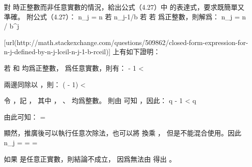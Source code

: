 \startsection[
  title={Proof of the master theorem},
]

\startEXERCISE \DIFFICULT
對  時正整數而非任意實數的情況，給出公式（4.27）中  的表達式，要求既簡單又準確。
附公式（4.27）：
\startformula
 n_j = \startmathcases
   \NC n \NC 若  \NR
   \NC \left\lceil n_{j-1}/b \right\rceil \NC 若  \NR
\stopmathcases
\stopformula
\stopEXERCISE
\startANSWER
若  爲正整數，則解爲：
\startformula
n_j = \left\lceil n / b^j \right\rceil
\stopformula

[url(http://math.stackexchange.com/questions/509862/closed-form-expression-for-n-j-defined-by-n-j-lceil-n-j-1-b-rceil)] 上有如下證明：

若  和  均爲正整數，  爲任意實數，則有：
\startformula
\left\lceil {} \right\rceil - 1
< 
\le \left\lceil {} \right\rceil
\stopformula

兩邊同除以 ，則：
\startformula
{}(\left\lceil {} \right\rceil - 1)
< 
\le {} \left\lceil {} \right\rceil
\stopformula

令 ，記 ，
其中 ， 、  均爲整數。
則由  可知 ，因此：
\startformula
q - 1 \le {} <  \le {} \le q
\stopformula

由此可知：
\startformula
\left\lceil {} \right\rceil = \left\lceil {} \left\lceil {} \right\rceil \right\rceil
\stopformula

顯然，推廣後可以執行任意次除法，也可以將 \m{\left\lceil \right\rceil} 換乘 \m{\lfloor \rfloor}，
但是不能混合使用。因此
\startformula
n_j = \left\lceil {} \right\rceil
    = \left\lceil {} \left\lceil {} \right\rceil \right\rceil
    = \left\lceil {} \right\rceil
\stopformula

如果  是任意正實數，則結論不成立，
因爲無法由  得出 。
\stopANSWER

